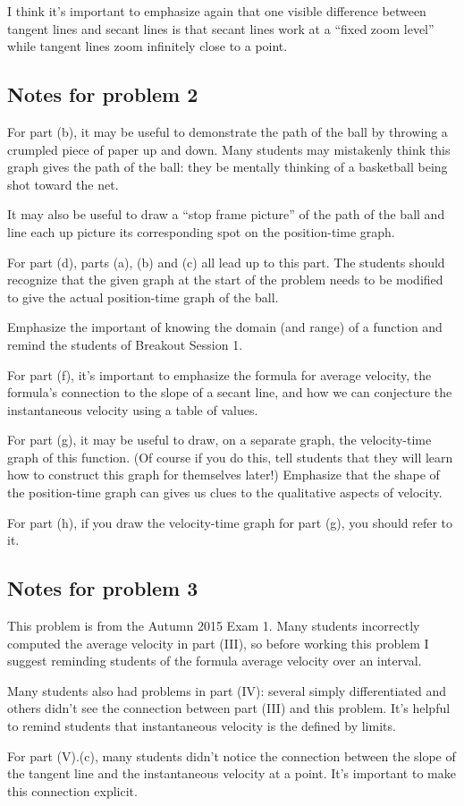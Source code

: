 \documentclass[handout, nooutcomes]{ximera}
\begin{document}
I think it's important to emphasize again that one visible difference between tangent lines and secant lines is that secant lines work at a ``fixed zoom level'' while tangent lines zoom infinitely close to a point.

\subsection*{Notes for problem 2}
For part (b), it may be useful to demonstrate the path of the ball by throwing a crumpled piece of paper up and down.
Many students may mistakenly think this graph gives the path of the ball: they be mentally thinking of a basketball being shot toward the net.

It may also be useful to draw a ``stop frame picture'' of the path of the ball and line each up picture its corresponding spot on the position-time graph.

For part (d), parts (a), (b) and (c) all lead up to this part.
The students should recognize that the given graph at the start of the problem needs to be modified to give the actual position-time graph of the ball.

Emphasize the important of knowing the domain (and range) of a function and remind the students of Breakout Session 1.


For part (f), it's important to emphasize the formula for average velocity, the formula's connection to the slope of a secant line, and how we can conjecture the instantaneous velocity using a table of values.

For part (g), it may be useful to draw, on a separate graph, the velocity-time graph of this function.
(Of course if you do this, tell students that they will learn how to construct this graph for themselves later!)
Emphasize that the shape of the position-time graph can gives us clues to the qualitative aspects of velocity.

For part (h), if you draw the velocity-time graph for part (g), you should refer to it.

\subsection*{Notes for problem 3}
This problem is from the Autumn 2015 Exam 1.
Many students incorrectly computed the average velocity in part (III), so before working this problem I suggest reminding students of the formula average velocity over an interval.

Many students also had problems in part (IV): several simply differentiated and others didn't see the connection between part (III) and this problem.
It's helpful to remind students that instantaneous velocity is the defined by limits.

For part (V).(c), many students didn't notice the connection between the slope of the tangent line and the instantaneous velocity at a point.
It's important to make this connection explicit.
\end{document}
